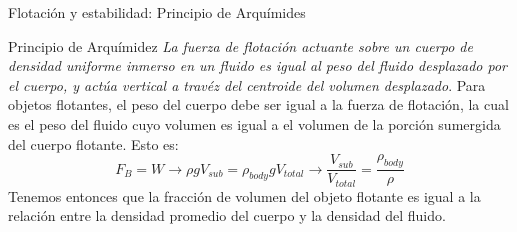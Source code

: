 \documentclass [xcolor=svgnames, t] {beamer}
\begin{document}
\begin{frame}{Flotaci\'on y estabilidad: Principio de Arqu\'imides}
\vspace{-0.5cm}
\begin{block}{Principio de Arqu\'imidez}
\emph{La fuerza de flotaci\'on actuante sobre un cuerpo de densidad uniforme inmerso en un fluido es igual al peso del fluido desplazado por el cuerpo, y act\'ua vertical a trav\'ez del centroide del volumen desplazado}. 
Para objetos flotantes, el peso del cuerpo debe ser igual a la fuerza de flotaci\'on, la cual es el peso del fluido cuyo volumen es igual a el volumen de la porci\'on sumergida del cuerpo flotante. Esto es:
$$
F_B = W \rightarrow \rho g V_{sub} = \rho_{body}gV_{total} \rightarrow \frac{V_{sub}}{V_{total}} = \frac{\rho_{body}}{\rho}
$$
Tenemos entonces que la fracci\'on de volumen del objeto flotante es igual a la relaci\'on entre la densidad promedio del cuerpo y la densidad del fluido. 
\end{block}
\end{frame}
\end{document}
